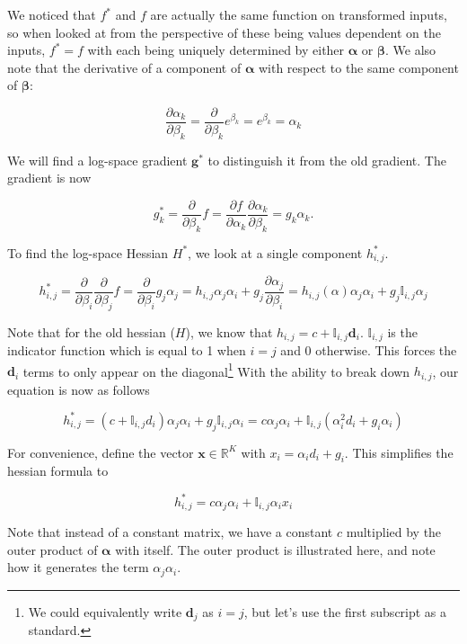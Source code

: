\documentclass[twoside]{article}
\begin{document}
We noticed that $f^*$ and $f$ are actually the same function on transformed inputs, so when looked at from the perspective of these being values dependent on the inputs, $f^* = f$ with each being uniquely determined by either $\boldsymbol{\alpha}$ or $\boldsymbol{\beta}$. We also note that the derivative of a component of $\boldsymbol{\alpha}$ with respect to the same component of $\boldsymbol{\beta}$:

\[
\frac{\partial {\alpha}_k}{\partial {\beta}_k} = \frac{\partial}{\partial {\beta}_k} e^{\beta_k} = e^{{\beta}_k} = {\alpha}_k
\]

We will find a log-space gradient $\boldsymbol{g}^*$ to distinguish it from the old gradient. The gradient is now

\[
{g}^*_k = \frac{\partial}{\partial \beta_k} f = \frac{\partial f}{\partial \alpha_k}  \frac{\partial \alpha_k}{\partial \beta_k} = {g}_k \alpha_k.
\]

To find the log-space Hessian $H^*$, we look at a single component $h^*_{i, j}$.

\[
{h}^*_{i, j} = \frac{\partial}{\partial \beta_i} \frac{\partial}{\partial \beta_j} f = \frac{\partial}{\partial \beta_i} {g}_j \alpha_j = {h}_{i, j} \alpha_j \alpha_i+ {g}_j \frac{\partial \alpha_j}{\partial \beta_i} = {h}_{i, j}(\alpha) \alpha_j \alpha_i + {g}_j\mathbb{I}_{i,j} \alpha_j
\]

Note that for the old hessian ($H$), we know that $h_{i, j} = c + \mathbb{I}_{i,j} \boldsymbol{d}_i$. \(\mathbb{I}_{i,j}\) is the indicator function which is equal to 1 when $i = j$ and 0 otherwise. This forces the $\boldsymbol{d}_i$ terms to only appear on the diagonal\footnote{We could equivalently write $\boldsymbol{d}_j$ as $i = j$, but let's use the first subscript as a standard.} With the ability to break down $h_{i, j}$, our equation is now as follows

\[
{h}^*_{i, j} = \left(c + \mathbb{I}_{i,j} {d}_i \right) \alpha_j \alpha_i+ {g}_j \mathbb{I}_{i,j} \alpha_i = c \alpha_j \alpha_i + \mathbb{I}_{i,j}\left(\alpha^2_i {d}_i + {g}_i \alpha_i\right)
\]

For convenience, define the vector \(\boldsymbol{x} \in \mathbb{R}^{K}\) with \({x}_i = \alpha_i {d}_i + {g}_i\). This simplifies the hessian formula to

\[
{h}^*_{i, j} = c \alpha_j \alpha_i + \mathbb{I}_{i,j} \alpha_i {x}_i
\]

Note that instead of a constant matrix, we have a constant $c$ multiplied by the outer product of $\boldsymbol{\alpha}$ with itself. The outer product is illustrated here, and note how it generates the term $\alpha_j \alpha_i$.
\end{document}
